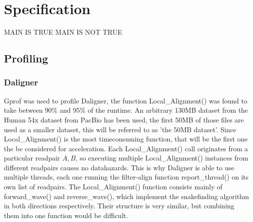 \documentclass[../main/thesis.tex]{subfiles}
\begin{document}
\chapter{Specification}
\ifdefined\main
\acresetall
MAIN IS TRUE
\newcommand{\codePath}{../4_specification/code/}
\newcommand{\figPath}{../4_specification/figures/}
\else
MAIN IS NOT TRUE

\fi

\section{Profiling}




\subsection{Daligner}
Gprof \cite{gprof} was used to profile Daligner, the function Local\_Alignment() was found to take between 90\% and 95\% of the runtime.
An arbitrary 130MB dataset from the Human 54x dataset from PacBio \cite{54x} has been used, the first 50MB of those files are used as a smaller dataset, this will be referred to as 'the 50MB dataset'.
Since Local\_Alignment() is the most timeconsuming function, that will be the first one the be considered for acceleration.
Each Local\_Alignment() call originates from a particular readpair $A, B$, so executing multiple Local\_Alignment() instances from different readpairs causes no datahazards.
This is why Daligner is able to use multiple threads, each one running the filter-align function report\_thread() on its own list of readpairs.
The Local\_Alignment() function consists mainly of forward\_wave() and reverse\_wave(), which implement the snakefinding algorithm in both directions respectively.
Their structure is very similar, but combining them into one function would be difficult.
\end{document}
